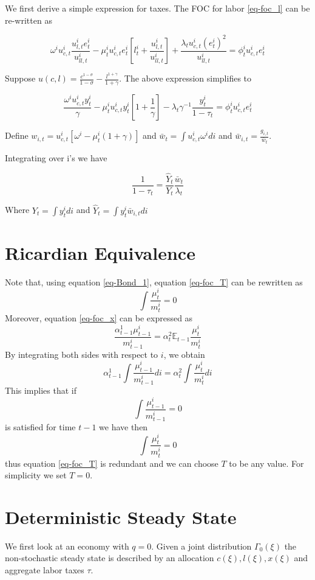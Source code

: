 \documentclass[thmsb,11pt]{article}
\newcommand{\EE}{\mathbb E}
\begin{document}
We first derive a simple expression for taxes. The FOC for labor \eqref{eq-foc_l} can be re-written as 


 \[
\omega^i u^i_{c,t}\frac{u^i_{l,t} e^i_t}{u^i_{ll,t}}- \mu^i_t u^i_{c,t}e^i_t[l^i_t +\frac{u^i_{l,t}}{u^i_{ll,t}}]+\frac{\lambda_t u^i_{c,t}(e^i_t)^2}{u^i_{ll,t}}=\phi^i_tu^i_{c,t}e^i_t    	
\]

 Suppose $u(c,l)=\frac{c^{1-\sigma}}{1-\sigma}-\frac{l^{1+\gamma}}{1+\gamma}$. The above expression simplifies to


 \[
\frac{ \omega^i u^i_{c,t}y^i_t}{\gamma}- \mu^i_t u^i_{c,t}y^i_t[1 +\frac{1}{\gamma}]-\lambda_t\gamma^{- 1}\frac{y^i_t }{1-\tau_t}=\phi^i_tu^i_{c,t}e^i_t    	
 \]

Define $w_{i,t}=u^i_{c,t}[\omega^i-\mu^i_t(1+\gamma)]$ and $\bar{w}_{t} = \int u^i_{c,t}\omega^i di$ and $\bar{w}_{i,t}=\frac{g_{i,t}}{\bar{w}_t}$.

Integrating  over i's we have

 
\begin{equation}
	\label{eq-labor_taxes}
\frac{1}{1-\tau_t}=\frac{\hat{Y}_t}{Y_t} \frac{\bar{w}_t }{\lambda_t}
\end{equation}   

Where $Y_t=\int y^i_t di$ and $\hat{Y}_t=\int y^i_t \bar{w}_{i,t}di$
\section{Ricardian Equivalence}
Note that, using equation \eqref{eq-Bond_1}, equation \eqref{eq-foc_T} can be rewritten as 
\[
	\int \frac{\mu^i_t}{m^i_t} = 0
\]  Moreover, equation \eqref{eq-foc_x} can be expressed as
\[
\frac{\alpha^1_{t-1} \mu^i_{t-1}}{m^i_{t-1}} = \alpha^2_t \EE_{t-1} \frac{\mu^i_t}{m^i_t}
\]By integrating both sides with respect to $i$, we obtain
\[
	\alpha^1_{t-1} \int \frac{\mu^i_{t-1}}{m^i_{t-1}}di = \alpha^2_t\int \frac{\mu^i_{t}}{m^i_t} di
\]  This implies that if 
\[
	\int \frac{\mu^i_{t-1}}{m^i_{t-1}} = 0
\]is satisfied for time $t-1$ we have then
\[
	\int \frac{\mu^i_t}{m^i_t} = 0
\] thus equation \eqref{eq-foc_T} is redundant and we can choose $T$ to be any value.  For simplicity we set $T=0$.

\section{Deterministic Steady State}
We first look at an economy with $q=0$. Given a joint distribution $\Gamma_0(\xi)$ the non-stochastic steady state is described by an allocation $c(\xi), l(\xi), x(\xi)$ and aggregate labor taxes $\tau$. 
\end{document}
